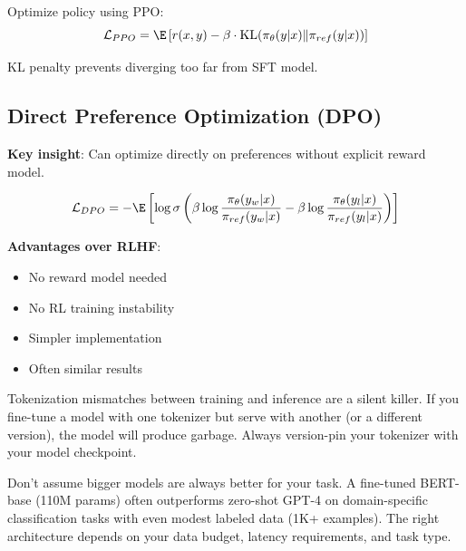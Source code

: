 Optimize policy using PPO:
\begin{equation}
\mathcal{L}_{PPO} = \E\left[r(x, y) - \beta \cdot \text{KL}(\pi_\theta(y|x) \| \pi_{ref}(y|x))\right]
\end{equation}

KL penalty prevents diverging too far from SFT model.

\subsection{Direct Preference Optimization (DPO)}

\textbf{Key insight}: Can optimize directly on preferences without explicit reward model.

\begin{equation}
\mathcal{L}_{DPO} = -\E\left[\log \sigma\left(\beta \log \frac{\pi_\theta(y_w|x)}{\pi_{ref}(y_w|x)} - \beta \log \frac{\pi_\theta(y_l|x)}{\pi_{ref}(y_l|x)}\right)\right]
\end{equation}

\textbf{Advantages over RLHF}:
\begin{itemize}
    \item No reward model needed
    \item No RL training instability
    \item Simpler implementation
    \item Often similar results
\end{itemize}

\begin{warningbox}
Tokenization mismatches between training and inference are a silent killer. If you fine-tune a model with one tokenizer but serve with another (or a different version), the model will produce garbage. Always version-pin your tokenizer with your model checkpoint.
\end{warningbox}

\begin{warningbox}
Don't assume bigger models are always better for your task. A fine-tuned BERT-base (110M params) often outperforms zero-shot GPT-4 on domain-specific classification tasks with even modest labeled data (1K+ examples). The right architecture depends on your data budget, latency requirements, and task type.
\end{warningbox}

